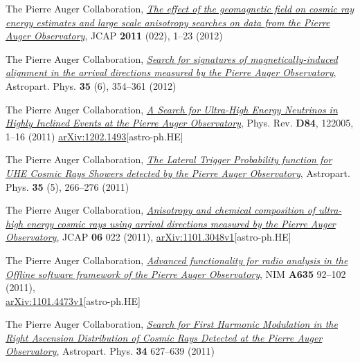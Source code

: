 \begin{etaremune}
\item {}The Pierre Auger Collaboration, 
\href{http://dx.doi.org/10.1088/1475-7516/2011/11/022}{\emph{The effect of the
geomagnetic field on cosmic ray energy estimates and large scale anisotropy
searches on data from the Pierre Auger Observatory}}, JCAP {\bf{2011}} (022),
1--23 (2012)

\item {}The Pierre Auger Collaboration, 
\href{http://dx.doi.org/10.1016/j.astropartphys.2011.10.004}{\emph{Search for
signatures of magnetically-induced alignment in the arrival directions measured
by the Pierre Auger Observatory}}, Astropart. Phys. {\bf{35}} (6), 354--361
(2012)

\item {}The Pierre Auger Collaboration,
\href{http://dx.doi.org/10.1016/10.1103/PhysRevD.84.122005}{\emph{A Search for
Ultra-High Energy Neutrinos in Highly Inclined Events at the Pierre Auger
Observatory}}, Phys.  Rev. {\bf D84}, 122005, 1--16 (2011)
\href{http://arxiv.org/abs/1202.1493}{arXiv:1202.1493}[astro-ph.HE]

\item {}The Pierre Auger Collaboration, 
\href{http://dx.doi.org/10.1016/j.astropartphys.2011.08.001}{\emph{The Lateral
Trigger Probability function for UHE Cosmic Rays Showers detected by the Pierre
Auger Observatory}}, Astropart. Phys. {\bf{35}} (5), 266--276 (2011)

\item {}The Pierre Auger Collaboration,
\href{http://dx.doi.org/10.1088/1475-7516/2011/06/022}{\emph{Anisotropy and
chemical composition of ultra-high energy cosmic rays using arrival directions
measured by the Pierre Auger Observatory}}, JCAP {\bf 06} 022 (2011),
\href{http://arxiv.org/abs/1106.3048}{arXiv:1101.3048v1}[astro-ph.HE]

\item {}The Pierre Auger Collaboration,
\href{http://dx.doi.org/10.1016/j.nima.2011.01.049}{{\emph{Advanced
functionality for radio analysis in the Offline software framework of the
Pierre Auger Observatory}}}, NIM {\bf A635} 92--102
(2011),\\
\href{http://arxiv.org/abs/1101.4473}{arXiv:1101.4473v1}[astro-ph.HE]

\item {}The Pierre Auger Collaboration,
\href{http://dx.doi.org/10.1016/j.astropartphys.2010.12.007}{\emph{Search for
First Harmonic Modulation in the Right Ascension Distribution of Cosmic Rays
Detected at the Pierre Auger Observatory}}, Astropart. Phys. {\bf 34} 627--639
(2011)


\end{etaremune}
